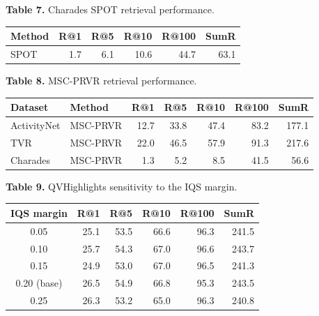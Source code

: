 \documentclass[10pt]{article}
\newcommand{\tablecaption}[2]{\begin{center}\footnotesize\textbf{Table #1.} #2\end{center}\vspace{-7pt}}
\begin{document}
\or
\tablecaption{7}{Charades SPOT retrieval performance.}
\begin{center}\small
\begin{tabular}{l r r r r r}
\toprule
Method & R@1 & R@5 & R@10 & R@100 & SumR \\
\midrule
SPOT & 1.7 & 6.1 & 10.6 & 44.7 & 63.1 \\
\bottomrule
\end{tabular}
\end{center}
\or
\tablecaption{8}{MSC-PRVR retrieval performance.}
\begin{center}\small
\begin{tabular}{l l r r r r r}
\toprule
Dataset & Method & R@1 & R@5 & R@10 & R@100 & SumR \\
\midrule
ActivityNet & MSC-PRVR & 12.7 & 33.8 & 47.4 & 83.2 & 177.1 \\
TVR & MSC-PRVR & 22.0 & 46.5 & 57.9 & 91.3 & 217.6 \\
Charades & MSC-PRVR & 1.3 & 5.2 & 8.5 & 41.5 & 56.6 \\
\bottomrule
\end{tabular}
\end{center}
\or
\tablecaption{9}{QVHighlights sensitivity to the IQS margin.}
\begin{center}\small
\begin{tabular}{c r r r r r}
\toprule
IQS margin & R@1 & R@5 & R@10 & R@100 & SumR \\
\midrule
0.05 & 25.1 & 53.5 & 66.6 & 96.3 & 241.5 \\
0.10 & 25.7 & 54.3 & 67.0 & 96.6 & 243.7 \\
0.15 & 24.9 & 53.0 & 67.0 & 96.5 & 241.3 \\
0.20 (base) & 26.5 & 54.9 & 66.8 & 95.3 & 243.5 \\
0.25 & 26.3 & 53.2 & 65.0 & 96.3 & 240.8 \\
\bottomrule
\end{tabular}
\end{center}
\fi
\end{document}
